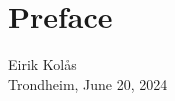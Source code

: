 
\section*{Preface}
\vspace{0.5cm}


\begin{center}
    \vspace{1cm}
    Eirik Kolås\\
    Trondheim, June 20, 2024
\end{center}


\cleardoublepage